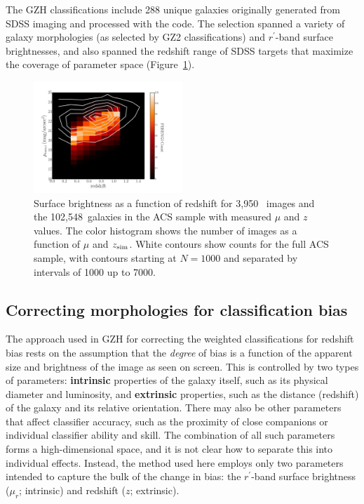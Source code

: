 \documentclass[twocolumn]{aastex6}
\begin{document}
The GZH classifications include 288 unique galaxies originally generated from
SDSS imaging and processed with the \ferengi{} code. The selection spanned a
variety of galaxy morphologies (as selected by GZ2 classifications) and
$r^\prime$-band surface brightnesses, and also spanned the redshift range of
SDSS targets that maximize the coverage of parameter space
(Figure~\ref{fig:sb_redshift}). 

\begin{figure}
\begin{center}
\includegraphics[width=0.5\textwidth]{figures/eye_of_sauron.pdf}
\caption{Surface brightness as a function of redshift for 3,950~\ferengi{}
images and the 102,548~galaxies in the ACS sample with measured $\mu$ and $z$
values. The color histogram shows the number of \ferengi{} images as a function
of $\mu$ and $z_{\rm sim}$. White contours show counts for the full ACS sample,
with contours starting at $N=1000$ and separated by intervals of 1000 up to
7000.} 
\label{fig:sb_redshift}
\end{center}
\end{figure}

\subsection{Correcting morphologies for classification bias}\label{ssec:zeta}

The approach used in GZH for correcting the weighted classifications for
redshift bias rests on the assumption that the \emph{degree} of bias is a
function of the apparent size and brightness of the image as seen on screen.
This is controlled by two types of parameters: \textbf{intrinsic} properties of
the galaxy itself, such as its physical diameter and luminosity, and
\textbf{extrinsic} properties, such as the distance (redshift) of the galaxy
and its relative orientation. There may also be other parameters that affect
classifier accuracy, such as the proximity of close companions or 
individual classifier ability and skill. The combination of all
such parameters forms a high-dimensional space, and it is not clear how to
separate this into individual effects. Instead, the method used here employs
only two parameters intended to capture the bulk of the change in bias: the
$r^\prime$-band surface brightness ($\mu_r$; intrinsic) and redshift ($z$;
extrinsic). 
\end{document}
